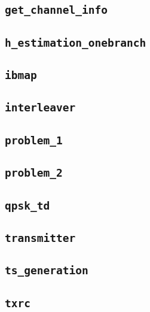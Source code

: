 \documentclass[10pt]{article}
\numberwithin{equation}{section}
\begin{document}
\subsection*{\texttt{get\_channel\_info}}


\subsection*{\texttt{h\_estimation\_onebranch}}


\subsection*{\texttt{ibmap}}


\subsection*{\texttt{interleaver}}


\subsection*{\texttt{problem\_1}}


\subsection*{\texttt{problem\_2}}


\subsection*{\texttt{qpsk\_td}}


\subsection*{\texttt{transmitter}}


\subsection*{\texttt{ts\_generation}}


\subsection*{\texttt{txrc}}

\end{document}
